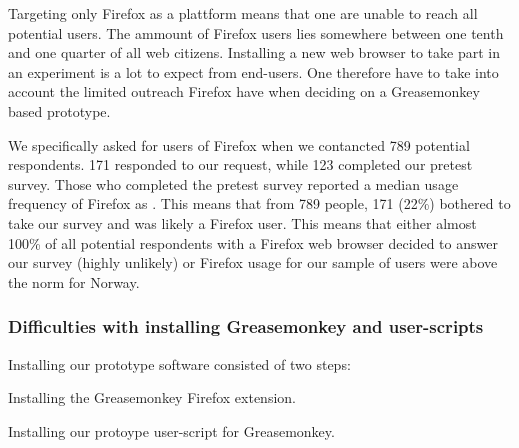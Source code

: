 Targeting only Firefox as a plattform means that one are unable to reach
all potential users. The ammount of Firefox users lies somewhere
between one tenth and one quarter of all web citizens.%
Installing a new web browser to take part in an
experiment is a lot to expect from end-users. One therefore have to take into
account the limited outreach Firefox have when deciding on a Greasemonkey
based prototype.

We specifically asked for users of Firefox when we contancted
789 potential respondents. 171 responded to our request, while 123 completed
our pretest survey.%
Those who completed the pretest survey reported a median usage frequency of
Firefox as
.%
This means that from 789 people, 171 (22\%) bothered to take our survey and
was likely a Firefox user.
This means that either almost 100\% of all potential respondents with a
Firefox web browser decided to answer our survey (highly unlikely) or Firefox
usage for our sample of \urort{} users were above the norm for Norway.

\subsubsection{Difficulties with installing Greasemonkey and user-scripts}

Installing our prototype software consisted of two steps:

\begin{enum}
  \item Installing the Greasemonkey Firefox extension.
  \item Installing our protoype user-script for Greasemonkey.
\end{enum}

